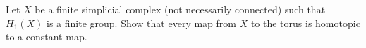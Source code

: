 Let $X$ be a finite simplicial complex (not necessarily connected)
such that $H_1(X)$ is a finite group. Show that every map from $X$ to
the torus is homotopic to a constant map.

